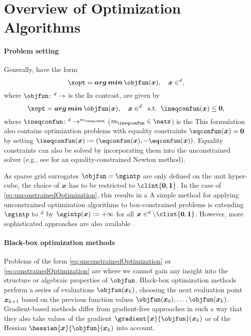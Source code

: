 \section{Overview of Optimization Algorithms}
\label{sec:51algorithms}

\paragraph{Problem setting}

Generally,  have the form
\begin{equation}
  \label{eq:unconstrainedOptimization}
  \xopt = \vecargmin \objfun(\*x),\quad
  \*x \in \real^d,
\end{equation}
where $\objfun\colon \real^d \to \real$ is the 
In contrast,  are given by
\begin{equation}
  \label{eq:constrainedOptimization}
  \xopt = \vecargmin \objfun(\*x),\quad
  \*x \in \real^d\;\;\text{s.t.}\;\;
  \ineqconfun(\*x) \le \*0,
\end{equation}
where
$\ineqconfun\colon \real^d \to \real^{m_{\ineqconfun}}$
($m_{\ineqconfun} \in \natz$)
is the 
This formulation also contains optimization problems
with equality constraints $\eqconfun(\*x) = \*0$
by setting $\ineqconfun(\*x) := (\eqconfun(\*x), -\eqconfun(\*x))$.
Equality constraints can also be solved by incorporating them
into the unconstrained solver (e.g., see \cite{Boyd04Convex}
for an equality-constrained Newton method).

As sparse grid surrogates $\objfun = \sgintp$ are only defined on the
unit hyper-cube,
the choice of ${\boldsymbol{x}}$ has to be restricted to $\clint{\*0, \*1}$.
In the case of \eqref{eq:unconstrainedOptimization},
this results in a 
A simple method for applying unconstrained optimization algorithms
to box-constrained problems is extending $\sgintp$ to $\real^d$ by
$\sgintp(\*x) := +\infty$ for all $\*x \in \real^d \setminus \clint{\*0, \*1}$.
However, more sophisticated
approaches are also available \cite{More87Optimization}.

\paragraph{Black-box optimization methods}

Problems of the form \eqref{eq:unconstrainedOptimization} or
\eqref{eq:constrainedOptimization} are 
where we cannot gain any insight into the structure or algebraic
properties of $\objfun$.
Black-box optimization methods perform a series of evaluations
$\objfun(\*x_k)$,
choosing the next evaluation point ${\boldsymbol{x}}_{k+1}$
based on the previous function values $\objfun(\*x_0), \dotsc, \objfun(\*x_k)$.
Gradient-based methods differ from gradient-free approaches
in such a way that they also take values of the gradient
$\gradient{\*x}{\objfun}(\*x_k)$ or of the Hessian
$\hessian{\*x}{\objfun}(\*x_k)$ into account.

